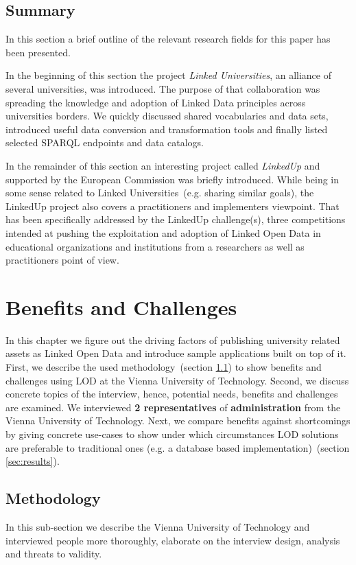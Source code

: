 \documentclass{article}
\begin{document}
\subsection{Summary}
In this section a brief outline of the relevant research fields for this paper has been presented.

In the beginning of this section the project \textit{Linked Universities}, an alliance of several universities, was introduced. The purpose of that collaboration was spreading the knowledge and adoption of Linked Data principles across universities borders. We quickly discussed shared vocabularies and data sets, introduced useful data conversion and transformation tools and finally listed selected SPARQL endpoints and data catalogs.

In the remainder of this section an interesting project called \textit{LinkedUp} and supported by the European Commission was briefly introduced. While being in some sense related to Linked Universities~(e.g. sharing similar goals), the LinkedUp project also covers a practitioners and implementers viewpoint. That has been specifically addressed by the LinkedUp challenge(s), three competitions intended at pushing the exploitation and adoption of Linked Open Data in educational organizations and institutions from a researchers as well as practitioners point of view. 
 
\section{Benefits and Challenges}
\label{sec:benefits_and_challenges}
In this chapter we figure out the driving factors of publishing university related assets as Linked Open Data and introduce sample applications built on top of it. First, we describe the used methodology~(section \ref{sec:methodology}) to show benefits and challenges using LOD at the Vienna University of Technology. Second, we discuss concrete topics of the interview, hence, potential needs, benefits and challenges are examined. We interviewed \textbf{2 representatives} of \textbf{administration} from the Vienna University of Technology. Next, we compare benefits against shortcomings by giving concrete use-cases to show under which circumstances LOD solutions are preferable to traditional ones (e.g. a database based implementation)~(section \ref{sec:results}). 

\subsection{Methodology}
\label{sec:methodology}
In this sub-section we describe the Vienna University of Technology and interviewed people more thoroughly, elaborate on the interview design, analysis and threats to validity.
\end{document}
